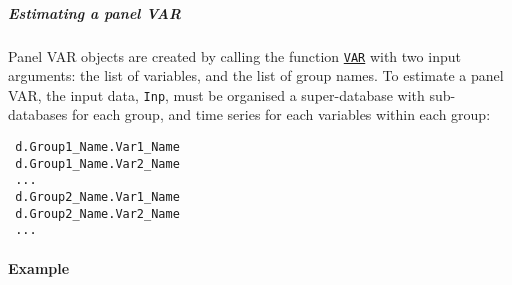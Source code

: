  \subparagraph{Estimating a panel VAR}
 
 Panel VAR objects are created by calling the function
 \href{VAR/VAR}{\texttt{VAR}} with two input arguments: the list of
 variables, and the list of group names. To estimate a panel VAR, the
 input data, \texttt{Inp}, must be organised a super-database with
 sub-databases for each group, and time series for each variables within
 each group:
 
 \begin{verbatim}
 d.Group1_Name.Var1_Name
 d.Group1_Name.Var2_Name
 ...
 d.Group2_Name.Var1_Name
 d.Group2_Name.Var2_Name
 ...
 \end{verbatim}
 
 \paragraph{Example}


